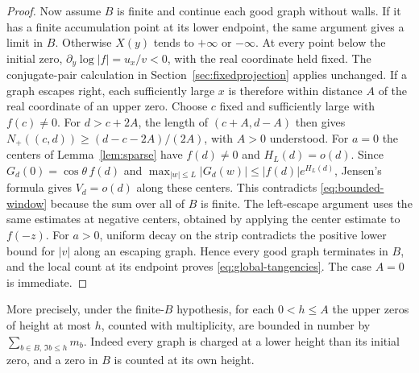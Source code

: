 \documentclass[11pt,a4paper]{article}
\numberwithin{equation}{section}
\begin{document}
\begin{proof}
Now assume $B$ is finite and continue each good graph without walls.
If it has a finite accumulation point at its lower endpoint, the same
argument gives a limit in $B$. Otherwise $X(y)$ tends to $+\infty$ or
$-\infty$. At every point below the initial zero,
$\partial_y\log|f|=u_x/v<0$, with the real coordinate held fixed.
The conjugate-pair calculation in Section~\ref{sec:fixedprojection} applies
unchanged. If a graph escapes right, each sufficiently large $x$ is
therefore within distance $A$ of the real coordinate of an upper zero.
Choose $c$ fixed and sufficiently large with $f(c)\ne0$. For $d>c+2A$,
the length of $(c+A,d-A)$ then gives
$N_+((c,d))\ge(d-c-2A)/(2A)$, with $A>0$ understood. For $a=0$ the
centers of Lemma~\ref{lem:sparse} have $f(d)\ne0$ and $H_L(d)=o(d)$.
Since $G_d(0)=\cos\theta\,f(d)$ and
$\max_{|w|\le L}|G_d(w)|\le|f(d)|e^{H_L(d)}$, Jensen's formula gives
$V_d=o(d)$ along these centers. This contradicts
\eqref{eq:bounded-window} because the sum over all of $B$ is finite.
The left-escape argument uses the same estimates at negative centers,
obtained by applying the center estimate to $f(-z)$. For $a>0$,
uniform decay on the strip contradicts the positive lower bound for
$|v|$ along an escaping graph. Hence every good graph terminates in
$B$, and the local count at its endpoint proves
\eqref{eq:global-tangencies}. The case $A=0$ is immediate.
\end{proof}

More precisely, under the finite-$B$ hypothesis, for each $0<h\le A$
the upper zeros of height at most $h$, counted with multiplicity,
are bounded in number by $\sum_{b\in B,\,\Im b\le h}m_b$.
Indeed every graph is charged at a lower height than its initial zero,
and a zero in $B$ is counted at its own height.
\end{document}
